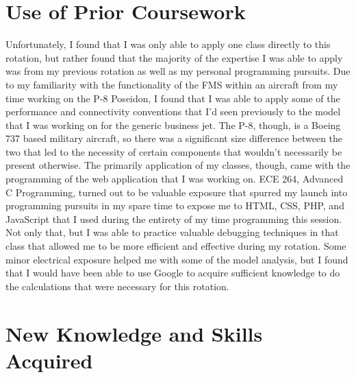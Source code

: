 \documentclass{article}
\begin{document}
\section{Use of Prior Coursework}
Unfortunately, I found that I was only able to apply one class directly to this rotation, but rather found that the majority of the expertise I was able to apply was from my previous rotation as well as my personal programming pursuits. 
Due to my familiarity with the functionality of the FMS within an aircraft from my time working on the P-8 Poseidon, I found that I was able to apply some of the performance and connectivity conventions that I'd seen previously to the model that I was working on for the generic business jet. The P-8, though, is a Boeing 737 based military aircraft, so there was a significant size difference between the two that led to the necessity of certain components that wouldn't necessarily be present otherwise. The primarily application of my classes, though, came with the programming of the web application that I was working on.
ECE 264, Advanced C Programming, turned out to be valuable exposure that spurred my launch into programming pursuits in my spare time to expose me to HTML, CSS, PHP, and JavaScript that I used during the entirety of my time programming this session. Not only that, but I was able to practice valuable debugging techniques in that class that allowed me to be more efficient and effective during my rotation.
Some minor electrical exposure helped me with some of the model analysis, but I found that I would have been able to use Google to acquire sufficient knowledge to do the calculations that were necessary for this rotation.

\newpage
\section{New Knowledge and Skills Acquired}
\end{document}
